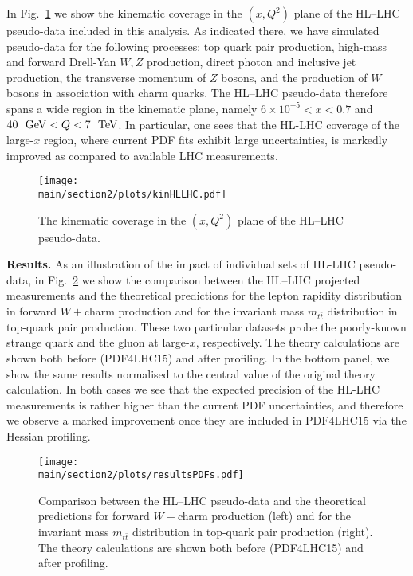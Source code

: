 In Fig.~\ref{fig:kinHLLHC} we show the
kinematic coverage in the $(x,Q^2)$ plane of the
  HL--LHC pseudo-data included in this analysis.
  As indicated there, we have simulated pseudo-data for
  the following processes: top quark pair production,
  high-mass and forward Drell-Yan $W,Z$ production, direct
  photon and inclusive jet production, the transverse momentum
  of $Z$ bosons, and the production of $W$ bosons in association
  with charm quarks.
  The HL--LHC pseudo-data therefore spans a wide region in the kinematic
  plane, namely $6\times 10^{-5} < x < 0.7$ and
  $40~{\rm ~\text{GeV}} < Q < 7~{\rm ~\text{TeV}}$.
  In particular, one sees that the HL-LHC coverage of the large-$x$ region,
  where current PDF fits exhibit large uncertainties,
  is markedly improved as compared to available LHC
  measurements.
  
\begin{figure}[t]
\centering
\texttt{[image: \\main/section2/plots/kinHLLHC.pdf]}
\caption{\small 
  The kinematic coverage in the $(x,Q^2)$ plane of the
  HL--LHC pseudo-data.
 \label{fig:kinHLLHC}} 
\end{figure}

{\bf Results.}
%
As an illustration of the impact of individual sets
of HL-LHC pseudo-data,
in Fig.~\ref{fig:resultsPDFs.pdf} we show 
the comparison between the HL--LHC projected measurements
and the theoretical predictions for the lepton
rapidity distribution in forward $W+$charm production
  and for the invariant mass $m_{t\bar{t}}$ distribution in top-quark
  pair production. These two particular datasets probe the poorly-known strange quark and
  the gluon at large-$x$, respectively.
   The theory calculations are shown both before (PDF4LHC15)
   and after profiling.
  In the bottom panel, we show the same results normalised
  to the central value of the original theory calculation.
  In both cases we see that the expected precision of the HL-LHC
  measurements is rather higher than the current PDF uncertainties,
  and therefore we observe a marked improvement once they
  are included in PDF4LHC15 via the Hessian profiling.
  

\begin{figure}[t]
  \begin{center}
\texttt{[image: \\main/section2/plots/resultsPDFs.pdf]}
\caption{\small Comparison between the HL--LHC pseudo-data
  and the theoretical predictions for forward $W+$charm production (left)
  and for the invariant mass $m_{t\bar{t}}$ distribution in top-quark
  pair production (right).
   The theory calculations are shown both before (PDF4LHC15)
   and after profiling.
       \label{fig:resultsPDFs.pdf} }
  \end{center}
\end{figure}

